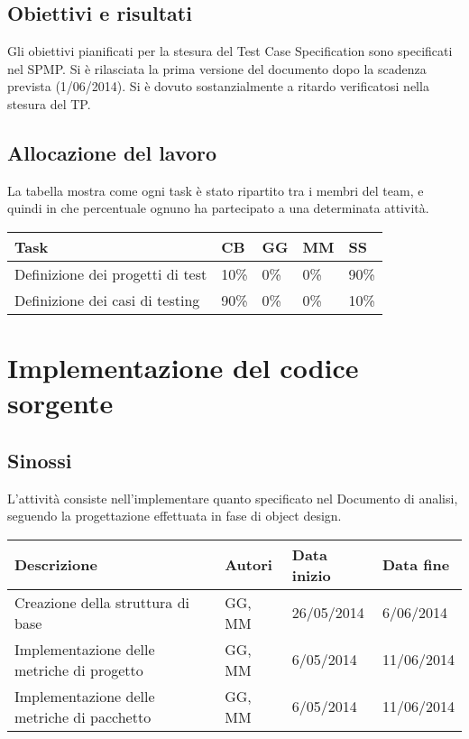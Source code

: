 \subsection{Obiettivi e risultati}
Gli obiettivi pianificati per la stesura del Test Case Specification sono specificati nel SPMP. Si è rilasciata la prima versione del documento dopo la scadenza prevista (1/06/2014). Si è dovuto sostanzialmente a ritardo verificatosi nella stesura del TP. 

\subsection{Allocazione del lavoro}
La tabella mostra come ogni task è stato ripartito tra i membri del team, e quindi in che percentuale ognuno ha partecipato a una determinata attività.
\begin{table}[ht]
 \begin{tabular}{|p{7.5cm}|p{1cm}|p{1cm}|p{1cm}|p{1cm}|}
  \hline
  \rowcolor{Gray}\textbf{Task}			& \textbf{CB}		& \textbf{GG}		& \textbf{MM}		& \textbf{SS}		\\
  \hline
  Definizione dei progetti di test		& 10\%			& 0\%			& 0\%			& 90\%			\\
  \hline
  Definizione dei casi di testing		& 90\%			& 0\%			& 0\%			& 10\%			\\
  \hline
 \end{tabular}
\end{table}


\section{Implementazione del codice sorgente}
\subsection{Sinossi}
L'attività consiste nell'implementare quanto specificato nel Documento di analisi, seguendo la progettazione effettuata in fase di object design.

\begin{table}[ht]
 \begin{tabular}{|p{6cm}|p{2cm}|p{2cm}|p{2cm}|}
    \hline
    \rowcolor{Gray}\textbf{Descrizione}			& \textbf{Autori}		& \textbf{Data inizio}			& \textbf{Data fine}	\\
    \hline
    Creazione della struttura di base			& GG, MM			& 26/05/2014				& 6/06/2014		\\
    \hline
    Implementazione delle metriche di progetto		& GG, MM			& 6/05/2014				& 11/06/2014		\\
    \hline
    Implementazione delle metriche di pacchetto		& GG, MM			& 6/05/2014				& 11/06/2014		\\
    \hline
 \end{tabular}
\end{table}

